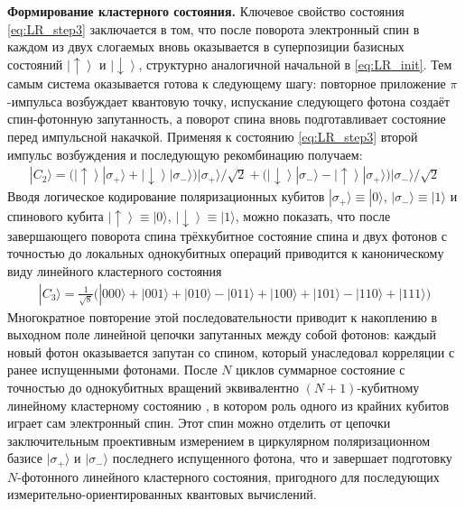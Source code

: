 \documentclass[11pt]{article}    %
\numberwithin{equation}{section}
\begin{document}
\medskip
\textbf{Формирование кластерного состояния.}
Ключевое свойство состояния \eqref{eq:LR_step3} заключается в том,
что после поворота электронный спин в каждом из двух слогаемых вновь
оказывается в суперпозиции базисных состояний
$\left|\uparrow\right\rangle$ и $\left|\downarrow\right\rangle$,
структурно аналогичной начальной в \eqref{eq:LR_init}. Тем самым
система оказывается готова к следующему шагу:
повторное приложение $\pi$-импульса возбуждает квантовую точку, испускание
следующего фотона создаёт спин-фотонную запутанность, а
поворот спина вновь подготавливает состояние перед импульсной накачкой.
Применяя к состоянию \eqref{eq:LR_step3} второй импульс возбуждения и
последующую рекомбинацию получаем:
\begin{gather}
    |C_2\rangle = \bigl(\left|\uparrow\right\rangle|\sigma_+\rangle
    + \left|\downarrow\right\rangle|\sigma_-\rangle\bigr)
    |\sigma_+\rangle / \sqrt{2}
    + \bigl(\left|\downarrow\right\rangle|\sigma_-\rangle
    - \left|\uparrow\right\rangle|\sigma_+\rangle\bigr)
    |\sigma_-\rangle / \sqrt{2}
    \label{eq:LR_two_cycles}
\end{gather}
Вводя логическое кодирование поляризационных кубитов
$|\sigma_+\rangle \equiv |0\rangle$, $|\sigma_-\rangle \equiv |1\rangle$
и спинового кубита $\left|\uparrow\right\rangle \equiv |0\rangle$,
$\left|\downarrow\right\rangle \equiv |1\rangle$, можно показать, что
после завершающего поворота спина трёхкубитное состояние спина и двух
фотонов с точностью до локальных однокубитных операций приводится к
каноническому виду линейного кластерного состояния \cite{lindner2009}
\begin{gather}
    |C_3\rangle = \frac{1}{\sqrt{8}}\bigl(
    |000\rangle + |001\rangle + |010\rangle - |011\rangle
    + |100\rangle + |101\rangle - |110\rangle + |111\rangle \bigr)
    \label{eq:cluster3}
\end{gather}
Многократное повторение этой последовательности приводит к
накоплению в выходном поле линейной цепочки запутанных между собой
фотонов: каждый новый фотон оказывается запутан со спином, который
унаследовал корреляции с ранее испущенными фотонами.
После $N$ циклов суммарное состояние с точностью до однокубитных
вращений эквивалентно $(N+1)$-кубитному линейному кластерному
состоянию \cite{lindner2009}, в котором роль одного из крайних
кубитов играет сам электронный спин. Этот спин можно отделить от
цепочки заключительным проективным измерением в циркулярном
поляризационном базисе $|\sigma_+\rangle$ и $|\sigma_-\rangle$
последнего испущенного фотона, что и завершает подготовку
$N$-фотонного линейного кластерного состояния, пригодного для
последующих измерительно-ориентированных квантовых вычислений.
\end{document}
